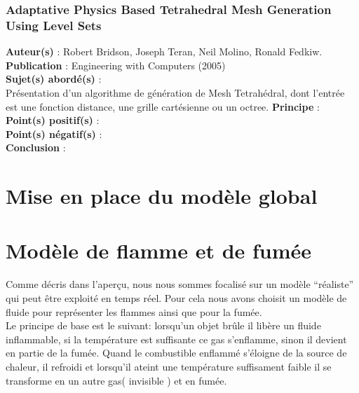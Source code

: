 \documentclass[a4paper,10pt]{article}
\begin{document}
\subsubsection{Adaptative Physics Based Tetrahedral Mesh Generation Using Level Sets}
\textbf{Auteur(s)} : Robert Bridson, Joseph Teran, Neil Molino, Ronald Fedkiw.\\
\textbf{Publication} : Engineering with Computers (2005)\\
\textbf{Sujet(s) abordé(s)} : \\
	Présentation d'un algorithme de génération de Mesh Tetrahédral, dont l'entrée est une fonction distance, une grille cartésienne ou un octree.
\textbf{Principe} :\\	
\textbf{Point(s) positif(s)} :\\
\textbf{Point(s) négatif(s)} :\\
\textbf{Conclusion} :\\









\section{Mise en place du modèle global}




\section{Modèle de flamme et de fumée}
Comme décris dans l'aperçu, nous nous sommes focalisé sur un modèle
``réaliste'' qui peut être exploité en temps réel. Pour cela nous
avons choisit un modèle de fluide pour représenter les flammes ainsi
que pour la fumée.\\

Le principe de base est le suivant: lorsqu'un objet brûle il libère un
fluide inflammable, si la température est suffisante ce gas
s'enflamme, sinon il devient en partie de la fumée. Quand le
combustible enflammé s'éloigne de la source de chaleur, il refroidi et
lorsqu'il ateint une température suffisament faible il se transforme
en un autre gas( invisible ) et en fumée.\\
\end{document}
